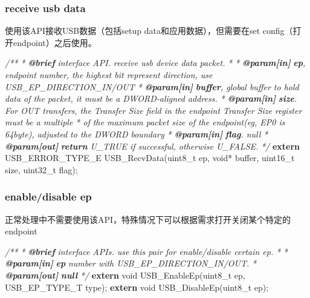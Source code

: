\documentclass[
  12pt,
]{book}
\newenvironment{Shaded}{\begin{snugshade}}{\end{snugshade}}
\newcommand{\AnnotationTok}[1]{\textcolor[rgb]{0.56,0.35,0.01}{\textbf{\textit{#1}}}}
\newcommand{\CommentTok}[1]{\textcolor[rgb]{0.56,0.35,0.01}{\textit{#1}}}
\newcommand{\CommentVarTok}[1]{\textcolor[rgb]{0.56,0.35,0.01}{\textbf{\textit{#1}}}}
\newcommand{\DataTypeTok}[1]{\textcolor[rgb]{0.13,0.29,0.53}{#1}}
\newcommand{\KeywordTok}[1]{\textcolor[rgb]{0.13,0.29,0.53}{\textbf{#1}}}
\newcommand{\NormalTok}[1]{#1}
\begin{document}
\hypertarget{receive-usb-data}{%
\subsubsection{receive usb data}\label{receive-usb-data}}

使用该API接收USB数据（包括setup data和应用数据），但需要在set config（打开endpoint）之后使用。

\begin{Shaded}
\begin{Highlighting}[]
\CommentTok{/**}
\CommentTok{ * }\AnnotationTok{@brief}\CommentTok{ interface API. receive usb device data packet.}
\CommentTok{ *}
\CommentTok{ * }\AnnotationTok{@param[in]}\CommentTok{ }\CommentVarTok{ep}\CommentTok{, endpoint number, the highest bit represent direction, use USB_EP_DIRECTION_IN/OUT}
\CommentTok{ * }\AnnotationTok{@param[in]}\CommentTok{ }\CommentVarTok{buffer}\CommentTok{, global buffer to hold data of the packet, it must be a DWORD-aligned address. }
\CommentTok{ * }\AnnotationTok{@param[in]}\CommentTok{ }\CommentVarTok{size}\CommentTok{. For OUT transfers, the Transfer Size field in the endpoint Transfer Size register must be a multiple}
\CommentTok{ *            of the maximum packet size of the endpoint(eg, EP0 is 64byte), adjusted to the DWORD boundary}
\CommentTok{ * }\AnnotationTok{@param[in]}\CommentTok{ }\CommentVarTok{flag}\CommentTok{. null}
\CommentTok{ * }\AnnotationTok{@param[out]}\CommentTok{ }\CommentVarTok{return}\CommentTok{ U_TRUE if successful, otherwise U_FALSE. }
\CommentTok{ */}
\KeywordTok{extern}\NormalTok{ USB_ERROR_TYPE_E USB_RecvData(}\DataTypeTok{uint8_t}\NormalTok{ ep, }\DataTypeTok{void}\NormalTok{* buffer, }\DataTypeTok{uint16_t}\NormalTok{ size, }\DataTypeTok{uint32_t}\NormalTok{ flag);}
\end{Highlighting}
\end{Shaded}

\hypertarget{enabledisable-ep}{%
\subsubsection{enable/disable ep}\label{enabledisable-ep}}

正常处理中不需要使用该API，特殊情况下可以根据需求打开关闭某个特定的endpoint

\begin{Shaded}
\begin{Highlighting}[]
\CommentTok{/**}
\CommentTok{ * }\AnnotationTok{@brief}\CommentTok{ interface APIs. use this pair for enable/disable certain ep.}
\CommentTok{ *}
\CommentTok{ * }\AnnotationTok{@param[in]}\CommentTok{ }\CommentVarTok{ep}\CommentTok{ number with USB_EP_DIRECTION_IN/OUT. }
\CommentTok{ * }\AnnotationTok{@param[out]}\CommentTok{ }\CommentVarTok{null}\CommentTok{ }
\CommentTok{ */}
\KeywordTok{extern} \DataTypeTok{void}\NormalTok{ USB_EnableEp(}\DataTypeTok{uint8_t}\NormalTok{ ep, USB_EP_TYPE_T type);}
\KeywordTok{extern} \DataTypeTok{void}\NormalTok{ USB_DisableEp(}\DataTypeTok{uint8_t}\NormalTok{ ep);}
\end{Highlighting}
\end{Shaded}
\end{document}
